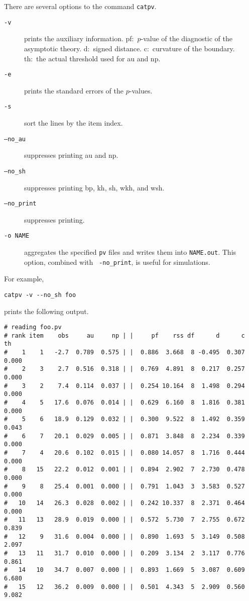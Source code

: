 \documentclass[12pt]{article}
\begin{document}
There are several options to the command {\tt catpv}. 
\begin{description}
 \item[\tt -v] prints the auxiliary information. pf:~$p$-value of the
	    diagnostic of the asymptotic theory. d:~signed
	    distance. c:~curvature of the boundary. th:~the actual
	    threshold used for au and np.
 \item[\tt -e] prints the standard errors of the $p$-values.
 \item[\tt -s] sort the lines by the item index.
 \item[\tt --no{\_}au]  suppresses printing au and np.
 \item[\tt --no{\_}sh]  suppresses printing bp, kh, sh, wkh, and wsh.
 \item[\tt --no{\_}print]  suppresses printing.
 \item[\tt -o NAME] aggregates the specified {\tt pv} files and writes
	    them into {\tt NAME.out}. This option, combined with {\tt
	    -no{\_}print}, is useful for simulations.
\end{description}
For example,
\begin{verbatim}
catpv -v --no_sh foo
\end{verbatim}
prints the following output.
{\small \begin{verbatim}
# reading foo.pv
# rank item    obs     au     np | |     pf    rss df      d      c     th
#    1    1   -2.7  0.789  0.575 | |  0.886  3.668  8 -0.495  0.307  0.000
#    2    3    2.7  0.516  0.318 | |  0.769  4.891  8  0.217  0.257  0.000
#    3    2    7.4  0.114  0.037 | |  0.254 10.164  8  1.498  0.294  0.000
#    4    5   17.6  0.076  0.014 | |  0.629  6.160  8  1.816  0.381  0.000
#    5    6   18.9  0.129  0.032 | |  0.300  9.522  8  1.492  0.359  0.043
#    6    7   20.1  0.029  0.005 | |  0.871  3.848  8  2.234  0.339  0.000
#    7    4   20.6  0.102  0.015 | |  0.080 14.057  8  1.716  0.444  0.000
#    8   15   22.2  0.012  0.001 | |  0.894  2.902  7  2.730  0.478  0.000
#    9    8   25.4  0.001  0.000 | |  0.791  1.043  3  3.583  0.527  0.000
#   10   14   26.3  0.028  0.002 | |  0.242 10.337  8  2.371  0.464  0.000
#   11   13   28.9  0.019  0.000 | |  0.572  5.730  7  2.755  0.672  0.839
#   12    9   31.6  0.004  0.000 | |  0.890  1.693  5  3.149  0.508  2.097
#   13   11   31.7  0.010  0.000 | |  0.209  3.134  2  3.117  0.776  0.861
#   14   10   34.7  0.007  0.000 | |  0.893  1.669  5  3.087  0.609  6.680
#   15   12   36.2  0.009  0.000 | |  0.501  4.343  5  2.909  0.560  9.082
\end{verbatim}}
\end{document}
